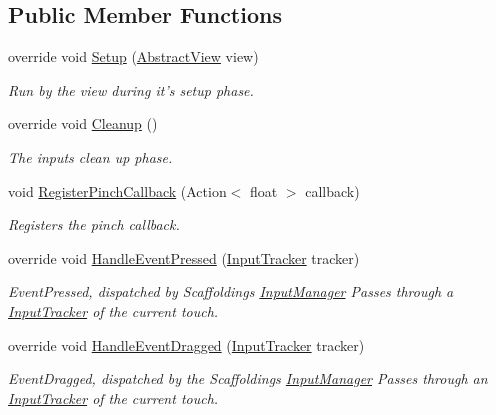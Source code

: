 \subsection*{Public Member Functions}
\begin{DoxyCompactItemize}
\item 
override void \hyperlink{class_scaffolding_1_1_pinch_input_aa6687d25d10c2f4e7106641e0647af35}{Setup} (\hyperlink{class_scaffolding_1_1_abstract_view}{Abstract\+View} view)
\begin{DoxyCompactList}\small\item\em Run by the view during it's setup phase. \end{DoxyCompactList}\item 
override void \hyperlink{class_scaffolding_1_1_pinch_input_a5849a64ba0a49d679e4a57fc28fe3f7a}{Cleanup} ()
\begin{DoxyCompactList}\small\item\em The inputs clean up phase. \end{DoxyCompactList}\item 
void \hyperlink{class_scaffolding_1_1_pinch_input_acaa10def18626148f344a8a50bdca22b}{Register\+Pinch\+Callback} (Action$<$ float $>$ callback)
\begin{DoxyCompactList}\small\item\em Registers the pinch callback. \end{DoxyCompactList}\item 
override void \hyperlink{class_scaffolding_1_1_pinch_input_aea53be8e94bef95c8373dd05639eaa41}{Handle\+Event\+Pressed} (\hyperlink{class_scaffolding_1_1_input_tracker}{Input\+Tracker} tracker)
\begin{DoxyCompactList}\small\item\em Event\+Pressed, dispatched by Scaffoldings \hyperlink{class_scaffolding_1_1_input_manager}{Input\+Manager} Passes through a \hyperlink{class_scaffolding_1_1_input_tracker}{Input\+Tracker} of the current touch. \end{DoxyCompactList}\item 
override void \hyperlink{class_scaffolding_1_1_pinch_input_a865f0201d2b7930241711abb68a7341d}{Handle\+Event\+Dragged} (\hyperlink{class_scaffolding_1_1_input_tracker}{Input\+Tracker} tracker)
\begin{DoxyCompactList}\small\item\em Event\+Dragged, dispatched by the Scaffoldings \hyperlink{class_scaffolding_1_1_input_manager}{Input\+Manager} Passes through an \hyperlink{class_scaffolding_1_1_input_tracker}{Input\+Tracker} of the current touch. \end{DoxyCompactList}\item 

\end{DoxyCompactItemize}
